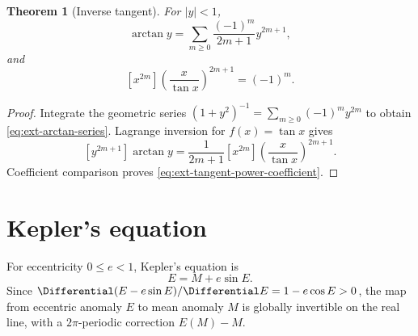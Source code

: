 \documentclass[11pt,a4paper,oneside,openany]{book}
\newtheorem{theorem}{Theorem}[chapter]
\theoremstyle{definition}
\theoremstyle{remark}
\begin{document}
\begin{theorem}[Inverse tangent]
For \(|y|<1\),
\begin{equation}\label{eq:ext-arctan-series}
 \arctan y=\sum_{m\ge0}\frac{(-1)^m}{2m+1}y^{2m+1},
\end{equation}
and
\begin{equation}\label{eq:ext-tangent-power-coefficient}
 [x^{2m}]\left(\frac{x}{\tan x}\right)^{2m+1}=(-1)^m.
\end{equation}
\end{theorem}
\begin{proof}
Integrate the geometric series
\((1+y^2)^{-1}=\sum_{m\ge0}(-1)^my^{2m}\) to obtain
\eqref{eq:ext-arctan-series}.  Lagrange inversion for \(f(x)=\tan x\) gives
\[
 [y^{2m+1}]\arctan y
 =\frac1{2m+1}[x^{2m}]
 \left(\frac{x}{\tan x}\right)^{2m+1}.
\]
Coefficient comparison proves \eqref{eq:ext-tangent-power-coefficient}.
\end{proof}

\section{Kepler's equation}

For eccentricity \(0\le e<1\), Kepler's equation is
\begin{equation}\label{eq:ext-kepler}
 E=M+e\sin E.
\end{equation}
Since \(\Differential(E-e\sin E)/\Differential E=1-e\cos E>0\), the map from eccentric anomaly
\(E\) to mean anomaly \(M\) is globally invertible on the real line, with a
\(2\pi\)-periodic correction \(E(M)-M\).
\end{document}
